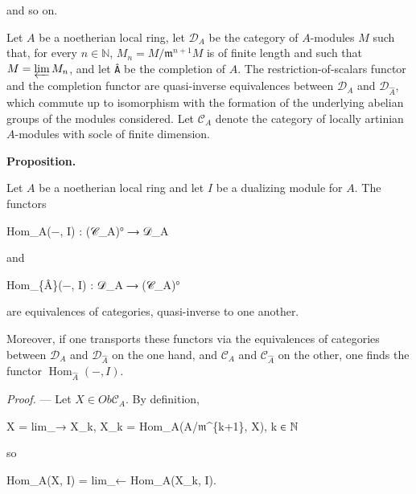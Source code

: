 \documentclass[
]{article}
\newenvironment{Shaded}{}{}
\newcommand{\NormalTok}[1]{#1}
\begin{document}
and so on.

Let \(A\) be a noetherian local ring, let \(\mathcal{D}_{A}\) be the
category of \(A\)-modules \(M\) such that, for every
\(n \in \mathbb{N}\), \(M_{n} = M/\mathfrak{m}^{n+1}M\) is of finite
length and such that \(M = \varprojlim M_{n}\), and let \texttt{Â} be
the completion of \(A\). The restriction-of-scalars functor and the
completion functor are quasi-inverse equivalences between
\(\mathcal{D}_{A}\) and \(\mathcal{D}_{\hat{A}}\), which commute up to
isomorphism with the formation of the underlying abelian groups of the
modules considered. Let \(\mathcal{C}_{A}\) denote the category of
locally artinian \(A\)-modules with socle of finite dimension.

\textbf{Proposition.}

Let \(A\) be a noetherian local ring and let \(I\) be a dualizing module
for \(A\). The functors

\begin{Shaded}
\begin{Highlighting}[]
\NormalTok{Hom\_A(−, I) : (𝒞\_A)° ⟶ 𝒟\_A}
\end{Highlighting}
\end{Shaded}

and

\begin{Shaded}
\begin{Highlighting}[]
\NormalTok{Hom\_\{Â\}(−, I) : 𝒟\_A ⟶ (𝒞\_A)°}
\end{Highlighting}
\end{Shaded}

are equivalences of categories, quasi-inverse to one another.

Moreover, if one transports these functors via the equivalences of
categories between \(\mathcal{D}_{A}\) and \(\mathcal{D}_{\hat{A}}\) on
the one hand, and \(\mathcal{C}_{A}\) and \(\mathcal{C}_{\hat{A}}\) on
the other, one finds the functor \(\operatorname{Hom}_{\hat{A}}(-, I)\).

\emph{Proof.} --- Let \(X \in Ob \mathcal{C}_{A}\). By definition,

\begin{Shaded}
\begin{Highlighting}[]
\NormalTok{X = lim\_→ X\_k,    X\_k = Hom\_A(A/𝔪\^{}\{k+1\}, X),}
\NormalTok{                  k ∈ ℕ}
\end{Highlighting}
\end{Shaded}

so

\begin{Shaded}
\begin{Highlighting}[]
\NormalTok{Hom\_A(X, I) = lim\_← Hom\_A(X\_k, I).}
\end{Highlighting}
\end{Shaded}
\end{document}
